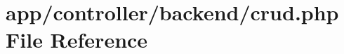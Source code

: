 \hypertarget{crud_8php}{\section{app/controller/backend/crud.php File Reference}
\label{crud_8php}
}

